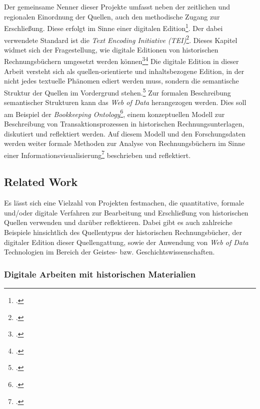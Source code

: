 \documentclass[12pt,a4paper]{article}
\begin{document}
\\
\\
Der gemeinsame Nenner dieser Projekte umfasst neben der zeitlichen und regionalen Einordnung der Quellen, auch den methodische Zugang zur Erschließung. Diese erfolgt im Sinne einer digitalen Edition\footcite{sahle2013digitale}. Der dabei verwendete Standard ist die \textit{Text Encoding Initiative (TEI)}\footcite{cummings2013text}. Dieses Kapitel widmet sich der Fragestellung, wie digitale Editionen von historischen Rechnungsbüchern umgesetzt werden können\footcite{tomasek2013encoding}\footcite{vogeler2016content} Die digitale Edition in dieser Arbeit versteht sich als quellen-orientierte und inhaltsbezogene Edition, in der nicht jedes textuelle Phänomen ediert werden muss, sondern die semantische Struktur der Quellen im Vordergrund stehen.\footcite{vogeler2019assertive} Zur formalen Beschreibung semantischer Strukturen kann das \textit{Web of Data} herangezogen werden. Dies soll am Beispiel der \textit{Bookkeeping Ontology}\footcite{pollin2019digital}, einem konzeptuellen Modell zur Beschreibung von Transaktionsprozessen in historischen Rechnungsunterlagen, diskutiert und reflektiert werden. Auf diesem Modell und den Forschungsdaten werden weiter formale Methoden zur Analyse von Rechnungsbüchern im Sinne einer Informationsvisualisierung\footcite{preim2010interaktive} beschrieben und reflektiert.

\subsection{Related Work}

Es lässt sich eine Vielzahl von Projekten festmachen, die quantitative, formale und/oder digitale Verfahren zur Bearbeitung und Erschließung von historischen Quellen verwenden und darüber reflektieren. Dabei gibt es auch zahlreiche Beispiele hinsichtlich des Quellentypus der historischen Rechnungsbücher, der digitaler Edition dieser Quellengattung, sowie der Anwendung von \textit{Web of Data} Technologien im Bereich der Geistes- bzw. Geschichtswissenschaften.



\subsubsection{Digitale Arbeiten mit historischen Materialien}
\end{document}
